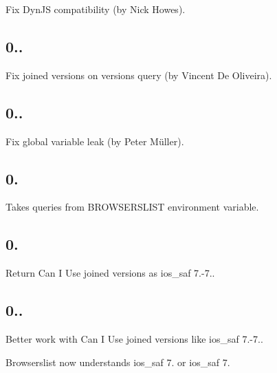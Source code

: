 \begin{DoxyItemize}
\item Fix Dyn\+JS compatibility (by Nick Howes).
\end{DoxyItemize}

\subsection*{0..}


\begin{DoxyItemize}
\item Fix joined versions on versions query (by Vincent De Oliveira).
\end{DoxyItemize}

\subsection*{0..}


\begin{DoxyItemize}
\item Fix global variable leak (by Peter Müller).
\end{DoxyItemize}

\subsection*{0.}


\begin{DoxyItemize}
\item Takes queries from {\ttfamily B\+R\+O\+W\+S\+E\+R\+S\+L\+I\+ST} environment variable.
\end{DoxyItemize}

\subsection*{0.}


\begin{DoxyItemize}
\item Return Can I Use joined versions as {\ttfamily ios\+\_\+saf 7.-\/7.}.
\end{DoxyItemize}

\subsection*{0..}


\begin{DoxyItemize}
\item Better work with Can I Use joined versions like {\ttfamily ios\+\_\+saf 7.-\/7.}.
\item Browserslist now understands {\ttfamily ios\+\_\+saf 7.} or {\ttfamily ios\+\_\+saf 7}.
\end{DoxyItemize}

